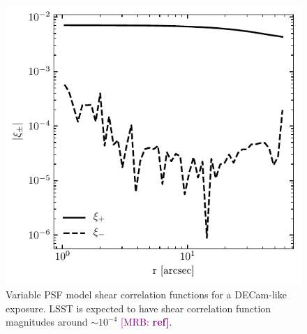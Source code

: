 \documentclass[fleqn,useAMS,usenatbib]{mnras}
\newcommand{\mrb}[1]{\textcolor{purple}{[MRB: \bf #1]}}
\begin{document}
\begin{figure}
  \includegraphics[width=\columnwidth]{figures/psxi.pdf}
  \caption{
    Variable PSF model shear correlation functions for a DECam-like exposure. LSST
    is expected to have shear correlation function magnitudes around
    $\sim10^{-4}$ \mrb{ref}.
    \label{fig:psxi}}
\end{figure}


\bsp
\label{lastpage}
\end{document}

